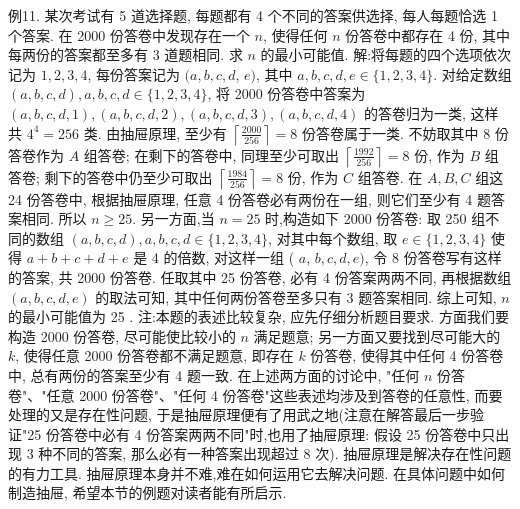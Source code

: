 例11. 某次考试有 5 道选择题, 每题都有 4 个不同的答案供选择, 每人每题恰选 1 个答案.
在 2000 份答卷中发现存在一个 $n$, 使得任何 $n$ 份答卷中都存在 4 份, 其中每两份的答案都至多有 3 道题相同.
求 $n$ 的最小可能值.
解:将每题的四个选项依次记为 $1,2,3,4$, 每份答案记为 $(a, b, c, d$, $e)$, 其中 $a, b, c, d, e \in\{1,2,3,4\}$.
对给定数组 $(a, b, c, d), a, b, c, d \in\{1,2,3,4\}$, 将 2000 份答卷中答案为 $(a, b, c, d, 1),(a, b, c, d, 2),(a, b, c, d, 3),(a, b, c, d, 4)$ 的答卷归为一类, 这样共 $4^4=256$ 类.
由抽屉原理, 至少有 $\left\lceil\frac{2000}{256}\right\rceil=8$ 份答卷属于一类.
不妨取其中 8 份答卷作为 $A$ 组答卷; 在剩下的答卷中, 同理至少可取出 $\left\lceil\frac{1992}{256}\right\rceil=8$ 份, 作为 $B$ 组答卷; 剩下的答卷中仍至少可取出 $\left\lceil\frac{1984}{256}\right\rceil=8$ 份, 作为 $C$ 组答卷.
在 $A, B, C$ 组这 24 份答卷中, 根据抽屉原理, 任意 4 份答卷必有两份在一组, 则它们至少有 4 题答案相同.
所以 $n \geqslant 25$.
另一方面,当 $n=25$ 时,构造如下 2000 份答卷:
取 250 组不同的数组 $(a, b, c, d), a, b, c, d \in\{1,2,3,4\}$, 对其中每个数组, 取 $e \in\{1,2,3,4\}$ 使得 $a+b+c+d+e$ 是 4 的倍数, 对这样一组 ( $a$, $b, c, d, e)$, 令 8 份答卷写有这样的答案, 共 2000 份答卷.
任取其中 25 份答卷, 必有 4 份答案两两不同, 再根据数组 $(a, b, c, d, e)$ 的取法可知, 其中任何两份答卷至多只有 3 题答案相同.
综上可知, $n$ 的最小可能值为 25 .
注:本题的表述比较复杂, 应先仔细分析题目要求.
方面我们要构造 2000 份答卷, 尽可能使比较小的 $n$ 满足题意; 另一方面又要找到尽可能大的 $k$, 使得任意 2000 份答卷都不满足题意, 即存在 $k$ 份答卷, 使得其中任何 4 份答卷中, 总有两份的答案至少有 4 题一致.
在上述两方面的讨论中, "任何 $n$ 份答卷"、"任意 2000 份答卷"、"任何 4 份答卷"这些表述均涉及到答卷的任意性, 而要处理的又是存在性问题, 于是抽屉原理便有了用武之地(注意在解答最后一步验证"25 份答卷中必有 4 份答案两两不同"时,也用了抽屉原理: 假设 25 份答卷中只出现 3 种不同的答案, 那么必有一种答案出现超过 8 次).
抽屉原理是解决存在性问题的有力工具.
抽屉原理本身并不难,难在如何运用它去解决问题.
在具体问题中如何制造抽屉, 希望本节的例题对读者能有所启示.


